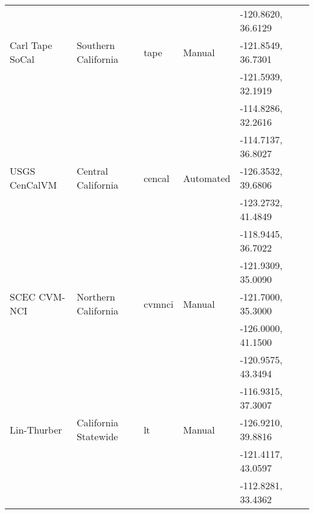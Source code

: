 \begin{table*}
\begin{tabular}[]{llllll}
                   &                       &               &              & -120.8620, 36.6129 &                              \\ 
Carl Tape SoCal    & Southern California   & tape          &  Manual      & -121.8549, 36.7301 & \citet{Tape_2010_GJI}        \\
                   &                       &               &              & -121.5939, 32.1919 &                              \\
                   &                       &               &              & -114.8286, 32.2616 &                              \\
                   &                       &               &              & -114.7137, 36.8027 &                              \\
USGS CenCalVM      & Central California    & cencal        &  Automated   & -126.3532, 39.6806 & \citet{Brocher_2005_Tech}    \\
                   &                       &               &              & -123.2732, 41.4849 & \citet{Brocher_2006_Proc}    \\
                   &                       &               &              & -118.9445, 36.7022 &                              \\
                   &                       &               &              & -121.9309, 35.0090 &                              \\
SCEC CVM-NCI       & Northern California   & cvmnci        &  Manual      & -121.7000, 35.3000 & \citet{Xu_2013_PAG}          \\
                   &                       &               &              & -126.0000, 41.1500 &                              \\
                   &                       &               &              & -120.9575, 43.3494 &                              \\
                   &                       &               &              & -116.9315, 37.3007 &                              \\
Lin-Thurber        & California Statewide  & lt            &  Manual      & -126.9210, 39.8816 & \citet{Lin_2010_BSSA}        \\
                   &                       &               &              & -121.4117, 43.0597 &                              \\
                   &                       &               &              & -112.8281, 33.4362 &                              \\

\end{tabular}
\end{table*}
